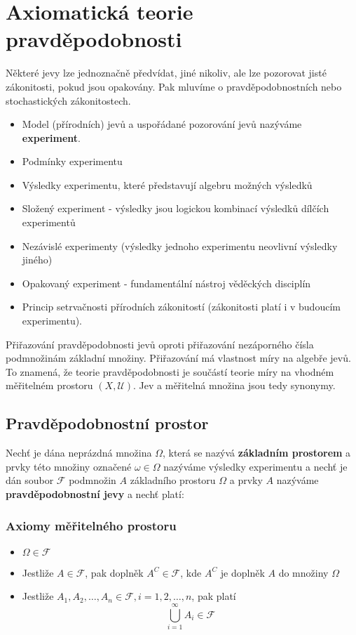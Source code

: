 	\section{Axiomatická teorie pravděpodobnosti}
	Některé jevy lze jednoznačně předvídat, jiné nikoliv, ale lze pozorovat jisté zákonitosti, pokud jsou opakovány. Pak mluvíme o pravděpodobnostních nebo stochastických zákonitostech.
	
	\begin{itemize}[noitemsep]
		\item Model (přírodních) jevů a uspořádané pozorování jevů nazýváme \textbf{experiment}.
		\item Podmínky experimentu 
		\item Výsledky experimentu, které představují algebru možných výsledků
		\item Složený experiment - výsledky jsou logickou kombinací výsledků dílčích experimentů
		\item Nezávislé experimenty (výsledky jednoho experimentu neovlivní výsledky jiného)
		\item Opakovaný experiment - fundamentální nástroj věděckých disciplín
		\item Princip setrvačnosti přírodních zákonitostí (zákonitosti platí i v budoucím experimentu).
	\end{itemize}
	
	Přiřazování pravděpodobnosti jevů oproti přiřazování nezáporného čísla podmnožinám základní množiny. Přiřazování má vlastnost míry na algebře jevů. To znamená, že teorie pravděpodobnosti je součástí teorie míry na vhodném měřitelném prostoru $(X,\mathscr{U})$. Jev a měřitelná množina jsou tedy synonymy.
	
	\subsection{Pravděpodobnostní prostor}
	Nechť je dána neprázdná množina $\Omega$, která se nazývá \textbf{základním prostorem} a prvky této množiny označené $\omega\in\Omega$ nazýváme výsledky experimentu a nechť je dán soubor $\mathscr{F}$ podmnožin $A$ základního prostoru $\Omega$ a prvky $A$ nazýváme \textbf{pravděpodobnostní jevy} a nechť platí:
	
	\subsubsection*{Axiomy měřitelného prostoru}
		\begin{itemize}[noitemsep]
			\item $\Omega\in\mathscr{F}$
			\item Jestliže $A\in\mathscr{F}$, pak doplněk $A^C\in\mathscr{F}$, kde $A^C$ je doplněk $A$ do množiny $\Omega$
			\item Jestliže $A_1,A_2,\ldots, A_n\in\mathscr{F}, i=1,2,\ldots,n$, pak platí
			\[ \bigcup_{i=1}^\infty A_i\in\mathscr{F} \]
		\end{itemize}
		

